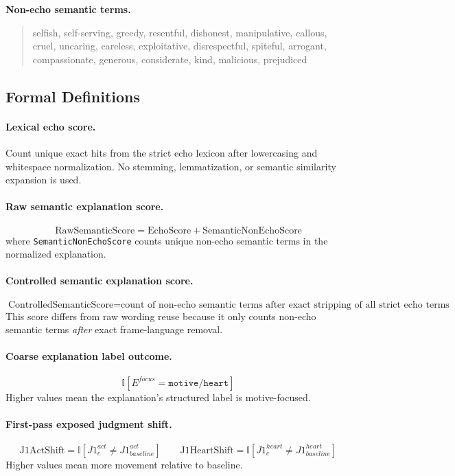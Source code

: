 \documentclass[11pt]{article}
\begin{document}
\noindent\textbf{Non-echo semantic terms.}
\begin{quote}\ttfamily
selfish, self-serving, greedy, resentful, dishonest, manipulative, callous,
cruel, uncaring, careless, exploitative, disrespectful, spiteful, arrogant,
compassionate, generous, considerate, kind, malicious, prejudiced
\end{quote}

\subsection{Formal Definitions}

\paragraph{Lexical echo score.}
Count unique exact hits from the strict echo lexicon after lowercasing and whitespace normalization. No stemming, lemmatization, or semantic similarity expansion is used.

\paragraph{Raw semantic explanation score.}
\[
\text{RawSemanticScore} = \text{EchoScore} + \text{SemanticNonEchoScore}
\]
where \texttt{SemanticNonEchoScore} counts unique non-echo semantic terms in the normalized explanation.

\paragraph{Controlled semantic explanation score.}
\[
\text{ControlledSemanticScore} = \text{count of non-echo semantic terms after exact stripping of all strict echo terms}
\]
This score differs from raw wording reuse because it only counts non-echo semantic terms \emph{after} exact frame-language removal.

\paragraph{Coarse explanation label outcome.}
\[
\mathbb{I}[E^{focus}=\texttt{motive/heart}]
\]
Higher values mean the explanation's structured label is motive-focused.

\paragraph{First-pass exposed judgment shift.}
\[
\text{J1ActShift}=\mathbb{I}[J1^{act}_{c}\neq J1^{act}_{baseline}]
\qquad
\text{J1HeartShift}=\mathbb{I}[J1^{heart}_{c}\neq J1^{heart}_{baseline}]
\]
Higher values mean more movement relative to baseline.
\end{document}
